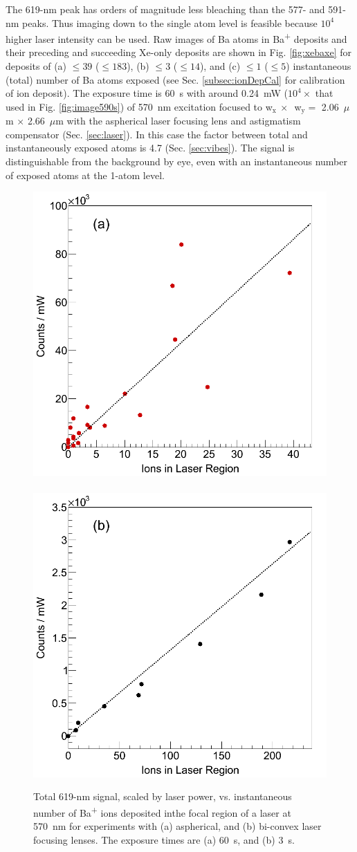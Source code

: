 The 619-nm peak has orders of magnitude less bleaching than the 577- and 591-nm peaks.  Thus imaging down to the single atom level is feasible because $10^4$ higher laser intensity can be used.  Raw images of Ba atoms in Ba\textsuperscript{+} deposits and their preceding and succeeding Xe-only deposits are shown in Fig. \ref{fig:xebaxe} for deposits of (a) $\leq 39$ ($\leq 183$), (b) $\leq 3$ ($\leq 14$), and (c) $\leq 1$ ($\leq 5$) instantaneous (total) number of Ba atoms exposed (see Sec. \ref{subsec:ionDepCal} for calibration of ion deposit).  The exposure time is 60~s with around 0.24~mW ($10^4 \times$ that used in Fig. \ref{fig:image590s}) of 570~nm excitation focused to w$_{\text{x}}~\times$~w$_{\text{y}} =$ 2.06~$\mu$m $\times$ 2.66~$\mu$m with the aspherical laser focusing lens and astigmatism compensator (Sec. \ref{sec:laser}).  In this case the factor between total and instantaneously exposed atoms is 4.7 (Sec. \ref{sec:vibes}).  The signal is distinguishable from the background by eye, even with an instantaneous number of exposed atoms at the 1-atom level.


\begin{figure} %
        \centering
                \includegraphics[width=.5\textwidth]{figures/lin_just20150807_lin.png}
                ~
                \includegraphics[width=.5\textwidth]{figures/lin_just20150526_lin.png}
                \caption{Total 619-nm signal, scaled by laser power, vs. instantaneous number of Ba\textsuperscript{+} ions deposited inthe focal region of a laser at 570~nm for experiments with (a) aspherical, and (b) bi-convex laser focusing lenses.  The exposure times are (a) 60~s, and (b) 3~s.}
\label{fig:lin}
\end{figure}

